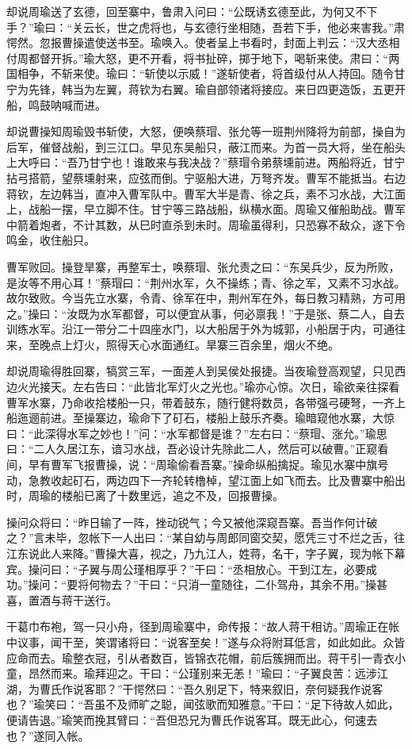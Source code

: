 却说周瑜送了玄德，回至寨中，鲁肃入问曰：“公既诱玄德至此，为何又不下手？”瑜曰：“关云长，世之虎将也，与玄德行坐相随，吾若下手，他必来害我。”肃愕然。忽报曹操遣使送书至。瑜唤入。使者呈上书看时，封面上判云：“汉大丞相付周都督开拆。”瑜大怒，更不开看，将书扯碎，掷于地下，喝斩来使。肃曰：“两国相争，不斩来使。瑜曰：“斩使以示威！”遂斩使者，将首级付从人持回。随令甘宁为先锋，韩当为左翼，蒋钦为右翼。瑜自部领诸将接应。来日四更造饭，五更开船，鸣鼓呐喊而进。

却说曹操知周瑜毁书斩使，大怒，便唤蔡瑁、张允等一班荆州降将为前部，操自为后军，催督战船，到三江口。早见东吴船只，蔽江而来。为首一员大将，坐在船头上大呼曰：“吾乃甘宁也！谁敢来与我决战？”蔡瑁令弟蔡壎前进。两船将近，甘宁拈弓搭箭，望蔡壎射来，应弦而倒。宁驱船大进，万弩齐发。曹军不能抵当。右边蒋钦，左边韩当，直冲入曹军队中。曹军大半是青、徐之兵，素不习水战，大江面上，战船一摆，早立脚不住。甘宁等三路战船，纵横水面。周瑜又催船助战。曹军中箭着炮者，不计其数，从巳时直杀到未时。周瑜虽得利，只恐寡不敌众，遂下令鸣金，收住船只。

曹军败回。操登旱寨，再整军士，唤蔡瑁、张允责之曰：“东吴兵少，反为所败，是汝等不用心耳！”蔡瑁曰：“荆州水军，久不操练；青、徐之军，又素不习水战。故尔致败。今当先立水寨，令青、徐军在中，荆州军在外，每日教习精熟，方可用之。”操曰：“汝既为水军都督，可以便宜从事，何必禀我！”于是张、蔡二人，自去训练水军。沿江一带分二十四座水门，以大船居于外为城郭，小船居于内，可通往来，至晚点上灯火，照得天心水面通红。旱寨三百余里，烟火不绝。

却说周瑜得胜回寨，犒赏三军，一面差人到吴侯处报捷。当夜瑜登高观望，只见西边火光接天。左右告曰：“此皆北军灯火之光也。”瑜亦心惊。次日，瑜欲亲往探看曹军水寨，乃命收拾楼船一只，带着鼓东，随行健将数员，各带强弓硬弩，一齐上船迤逦前进。至操寨边，瑜命下了矴石，楼船上鼓乐齐奏。瑜暗窥他水寨，大惊曰：“此深得水军之妙也！”问：“水军都督是谁？”左右曰：“蔡瑁、涨允。”瑜思曰：“二人久居江东，谙习水战，吾必设计先除此二人，然后可以破曹。”正窥看间，早有曹军飞报曹操，说：“周瑜偷看吾寨。”操命纵船擒捉。瑜见水寨中旗号动，急教收起矴石，两边四下一齐轮转橹棹，望江面上如飞而去。比及曹寨中船出时，周瑜的楼船已离了十数里远，追之不及，回报曹操。

操问众将曰：“昨日输了一阵，挫动锐气；今又被他深窥吾寨。吾当作何计破之？”言未毕，忽帐下一人出曰：“某自幼与周郎同窗交契，愿凭三寸不烂之舌，往江东说此人来降。”曹操大喜，视之，乃九江人，姓蒋，名干，字子翼，现为帐下幕宾。操问曰：“子翼与周公瑾相厚乎？”干曰：“丞相放心。干到江左，必要成功。”操问：“要将何物去？”干曰：“只消一童随往，二仆驾舟，其余不用。”操甚喜，置酒与蒋干送行。

干葛巾布袍，驾一只小舟，径到周瑜寨中，命传报：“故人蒋干相访。”周瑜正在帐中议事，闻干至，笑谓诸将曰：“说客至矣！”遂与众将附耳低言，如此如此。众皆应命而去。瑜整衣冠，引从者数百，皆锦衣花帽，前后簇拥而出。蒋干引一青衣小童，昂然而来。瑜拜迎之。干曰：“公瑾别来无恙！”瑜曰：“子翼良苦：远涉江湖，为曹氏作说客耶？”干愕然曰：“吾久别足下，特来叙旧，奈何疑我作说客也？”瑜笑曰：“吾虽不及师旷之聪，闻弦歌而知雅意。”干曰：“足下待故人如此，便请告退。”瑜笑而挽其臂曰：“吾但恐兄为曹氏作说客耳。既无此心，何速去也？”遂同入帐。

